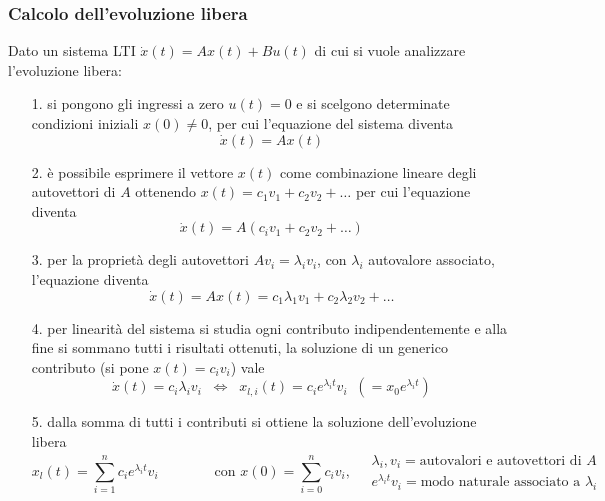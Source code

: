 \subsubsection*{Calcolo dell'evoluzione libera}
Dato un sistema LTI \(\dot{x}(t) = Ax(t) + Bu(t)\) di cui si vuole analizzare l'evoluzione libera:
\begin{itemize}
	\item[1.] si pongono gli ingressi a zero \(u(t) = 0\) e si scelgono determinate condizioni iniziali \(x(0) \neq 0\), per
	cui l'equazione del sistema diventa \[\dot{x}(t) = Ax(t)\]
	\item[2.] è possibile esprimere il vettore \(x(t)\) come combinazione lineare degli autovettori di \(A\) ottenendo \(x(t) = c_1 v_1 + c_2 v_2 + \dots\)
	per cui l'equazione diventa \[\dot{x}(t) = A(c_i v_1 + c_2 v_2 + \dots)\]
	\item[3.] per la proprietà degli autovettori \(A v_i = \lambda_i v_i\), con \(\lambda_i\) autovalore associato, l'equazione
	diventa \[\dot{x}(t) = Ax(t) = c_1 \lambda_1 v_1 + c_2 \lambda_2 v_2 + \dots\]
	\item[4.] per linearità del sistema si studia ogni contributo indipendentemente e alla fine si sommano tutti i risultati
	ottenuti, la soluzione di un generico contributo (si pone \(x(t) = c_i v_i\)) vale
	\[\dot{x}(t) = c_i \lambda_i v_i \;\; \Leftrightarrow \;\; x_{l,i}(t) = c_i e^{\lambda_i t} v_i \;\; (= x_0 e^{\lambda_i t})\]
	\item[5.] dalla somma di tutti i contributi si ottiene la soluzione dell'evoluzione libera
	\[x_l(t) = \sum_{i=1}^{n} c_i e^{\lambda_i t} v_i \qquad \qquad \text{con } x(0) = \sum_{i=0}^{n} c_i v_i, \quad \begin{array}{l}
		\lambda_i, v_i = \text{autovalori e autovettori di } A \\
		e^{\lambda_i t} v_i =  \text{modo naturale associato a } \lambda_i
	\end{array}\]
\end{itemize}

